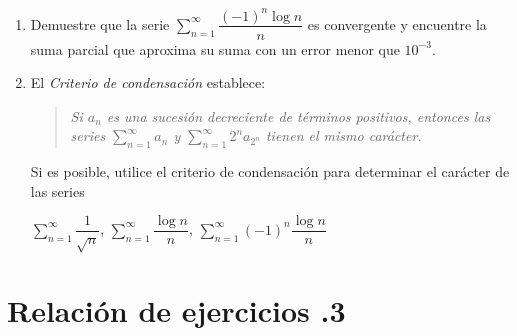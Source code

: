 \begin{enumerate}
\item
Demuestre que la serie $\displaystyle\sum_{n=1}^\infty   \dfrac{(-1)^n\log n}{n}$ es convergente y encuentre la suma parcial que aproxima su suma con un error menor que $10^{-3}$.

\item
El \emph{Criterio de condensación} establece:
\begin{quote}
\emph{Si $a_n$ es una sucesión
decreciente de términos positivos, entonces las series $\displaystyle\sum_{n=1}^\infty   a_n$ y 
$\displaystyle\sum_{n=1}^\infty   2^n a_{2^n}$ tienen el mismo carácter.}
\end{quote}
Si es posible, utilice el criterio de condensación para determinar el carácter de las series
\setcontadoralph
\begin{centrar}
\nitem $\displaystyle\sum_{n=1}^\infty   \dfrac1{\sqrt n}$, \hfill
\nitem $\displaystyle\sum_{n=1}^\infty   \dfrac{\log n}{n}$,\hfill
\nitem $\displaystyle\sum_{n=1}^\infty   (-1)^n\dfrac{\log n}{n}$
\end{centrar}


\end{enumerate}

\newpage

\section*{Relación de ejercicios \thechapter.3}

\pagestyle{relaciones}

